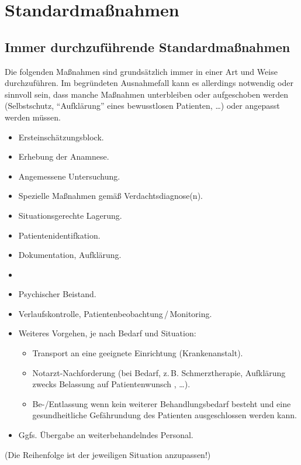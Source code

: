 
\clearpage
\section{Standardmaßnahmen}

\subsection{Immer durchzuführende Standardmaßnahmen}
\label{topic:standardmassnahmen-immer}

Die folgenden Maßnahmen sind grundsätzlich immer in einer  Art und Weise durchzuführen. Im begründeten Ausnahmefall kann es
allerdings notwendig oder sinnvoll sein, dass manche Maßnahmen unterbleiben oder
aufgeschoben werden (Selbstschutz, "`Aufklärung"' eines bewusstlosen Patienten,
\ldots{}) oder angepasst werden müssen.

{\label{m:standardmassnahmen-immer}}{%

\begin{itemize}
  \item Ersteinschätzungsblock.
  \item Erhebung der Anamnese. 
  \item Angemessene Untersuchung. 
  \item Spezielle Maßnahmen gemäß Verdachtsdiagnose(n). 
  \item Situationsgerechte Lagerung. 
  \item Patientenidentifkation.
  \item Dokumentation, Aufklärung.
  \item {}
  \item Psychischer Beistand.
  \item Verlaufskontrolle, Patientenbeobachtung\,/\,Monitoring.
  
  \item Weiteres Vorgehen, je nach Bedarf und Situation:
  \begin{itemize}
  \item Transport an eine geeignete Einrichtung (Krankenanstalt). 
  \item Notarzt-Nachforderung (bei Bedarf, z.\,B. Schmerztherapie,
  Aufklärung zwecks Belassung auf Patientenwunsch , \ldots).
  \item Be-/Entlassung wenn kein weiterer Behandlungsbedarf besteht und eine
  gesundheitliche Gefährundung des Patienten ausgeschlossen werden kann. 
  \end{itemize}
  \item Ggfs. Übergabe an weiterbehandelndes Personal.
\end{itemize}

{\scriptsize (Die Reihenfolge ist der jeweiligen Situation anzupassen!)}

}


